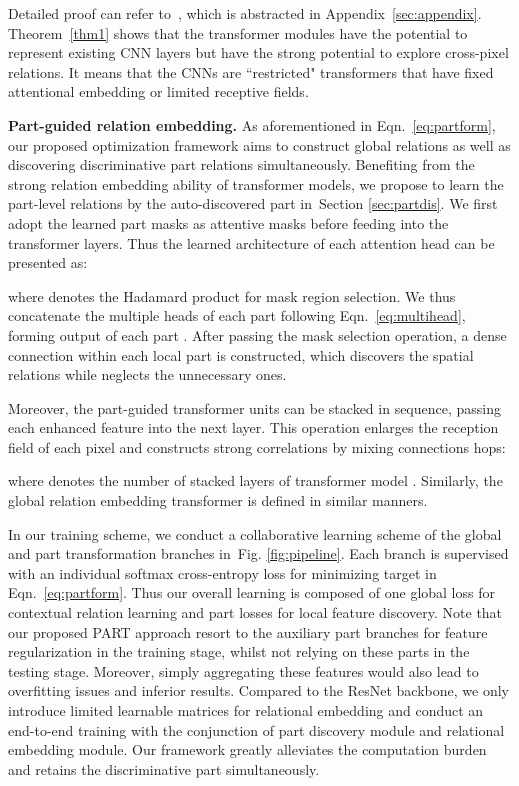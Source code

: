 \documentclass[journal]{IEEEtran}
\newcommand{\figref}[1]{Fig. \ref{#1}}
\newcommand{\secref}[1]{Section \ref{#1}}
\begin{document}
Detailed proof can refer to~\cite{cordonnier2020relationship}, which is abstracted in Appendix~\ref{sec:appendix}. Theorem~\ref{thm1} shows that the transformer modules have the potential to represent existing CNN layers but have the strong potential to explore cross-pixel relations. It means that the CNNs are ``restricted" transformers that have fixed attentional embedding or limited receptive fields.

\textbf{Part-guided relation embedding.} As aforementioned in Eqn.~\eqref{eq:partform}, our proposed optimization framework aims to construct global relations as well as discovering discriminative part relations simultaneously. Benefiting from the strong relation embedding ability of transformer models, we propose to learn the part-level relations by the auto-discovered part in~\secref{sec:partdis}. We first adopt the learned part masks  as attentive masks before feeding into the transformer layers.
Thus the learned architecture of each attention head can be presented as:

where  denotes the Hadamard product for mask region selection. We thus concatenate the multiple heads of each part following Eqn.~\eqref{eq:multihead}, forming output  of each part . After passing the mask selection operation, a dense connection within each local part is constructed, which discovers the spatial relations while neglects the unnecessary ones.

Moreover, the part-guided transformer units can be stacked in sequence, passing each enhanced feature  into the next layer. This operation enlarges the reception field of each pixel and constructs strong correlations by mixing connections hops:

where  denotes the number of stacked layers of transformer model . Similarly, the global relation embedding transformer  is defined in similar manners.

In our training scheme, we conduct a collaborative learning scheme of the global and  part transformation branches in~\figref{fig:pipeline}. Each branch is supervised with an individual softmax cross-entropy loss for minimizing target  in Eqn.~\eqref{eq:partform}. Thus our overall learning is composed of one global loss for contextual relation learning and  part losses for local feature discovery. Note that our proposed PART approach resort to the  auxiliary part branches for feature regularization in the training stage, whilst not relying on these parts in the testing stage. Moreover, simply aggregating these features would also lead to overfitting issues and inferior results. Compared to the ResNet backbone, we only introduce limited learnable matrices for relational embedding and conduct an end-to-end training with the conjunction of part discovery module and relational embedding module. Our framework greatly alleviates the computation burden and retains the discriminative part simultaneously.
\end{document}
